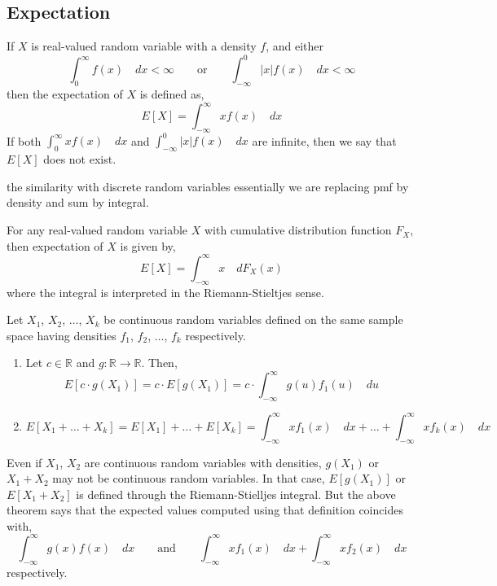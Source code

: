 \subsection{Expectation}
\begin{definition}
If $X$ is real-valued random variable with a density $f$, and either 
\[
    \int_0^\infty f(x) \quad dx < \infty
    \qquad \text{or} \qquad
    \int_{-\infty}^0 \vert x \vert f(x) \quad dx < \infty
\]
then the expectation of $X$ is defined as,
\[
    E[X] = \int_{-\infty}^{\infty} x f(x) \quad dx
\]
If both $\int_{0}^{\infty} x f(x) \quad dx$ and $\int_{-\infty}^0 \vert x
\vert f(x) \quad dx$ are infinite, then we say that $E[X]$ does not exist.
\end{definition}
\note the similarity with discrete random variables essentially we are
replacing pmf by density and sum by integral.

\begin{definition}
For any real-valued random variable $X$ with cumulative distribution function
$F_X$, then expectation of $X$ is given by,
\[
    E[X] = \int_{-\infty}^{\infty} x \quad dF_X(x)
\]
where the integral is interpreted in the Riemann-Stieltjes sense. 
\end{definition}

\begin{theorem}
Let $X_1$, $X_2$, $\dots$, $X_k$ be continuous random variables defined on the
same sample space having densities $f_1$, $f_2$, $\dots$, $f_k$ respectively.
\begin{enumerate}[noitemsep, topsep=0em]
\item
    Let $c \in \mathbb{R}$ and $g : \mathbb{R} \rightarrow \mathbb{R}$. Then, 
\[
    E[c \cdot g(X_1)] = c \cdot E[g(X_1)] 
                      = c \cdot \int_{-\infty}^{\infty} g(u)f_1(u) \quad du
\]
\item
\[
    E[X_1 + \dots + X_k] = E[X_1] + \dots + E[X_k]
                         = \int_{-\infty}^{\infty} x f_1(x) \quad dx +
                           \dots +
                           \int_{-\infty}^{\infty} x f_k(x) \quad dx
\]
\end{enumerate}
\end{theorem}
\note Even if $X_1$, $X_2$ are continuous random variables with densities,
$g(X_1)$ or $X_1 + X_2$ may not be continuous random variables. In that case, 
$E[g(X_1)]$ or $E[X_1 + X_2]$ is defined through the Riemann-Stielljes
integral. But the above theorem says that the expected values computed using
that definition coincides with,
\[
    \int_{-\infty}^{\infty} g(x) f(x) \quad dx
    \qquad \text{and} \qquad
    \int_{-\infty}^{\infty} x f_1(x) \quad dx + 
    \int_{-\infty}^{\infty} x f_2(x) \quad dx
\]
respectively.

